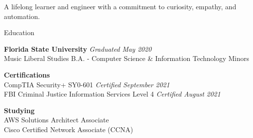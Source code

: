 \documentclass{resume} %
\begin{document}
	\begin{center} {A lifelong learner and engineer with a commitment to curiosity, empathy, and automation.}\end{center}
	\begin{rSection}{Education}
		
		{\bf Florida State University} \hfill {\em Graduated May 2020} \\
		Music Liberal Studies B.A. - Computer Science \& Information Technology Minors
		
		{\bf Certifications} \hfill {\em } \\
		CompTIA Security+ SY0-601 \hfill {\em Certified  September 2021}\\
		FBI Criminal Justice Information Services Level 4 \hfill {\em Certified August 2021}
		
		{\bf Studying}\\
		AWS Solutions Architect Associate\\
		Cisco Certified Network Associate (CCNA)
	\end{rSection}

	
\end{document}
